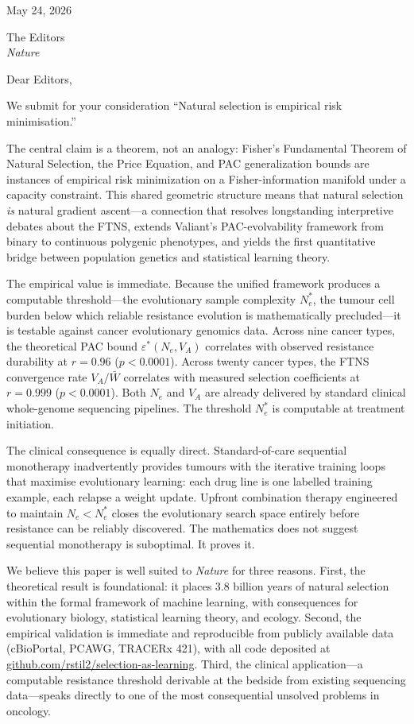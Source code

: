 \documentclass[11pt]{article}
\begin{document}
\noindent
May 24, 2026

\bigskip

\noindent
The Editors\\
\textit{Nature}

\bigskip

\noindent
Dear Editors,

\medskip

We submit for your consideration ``Natural selection is empirical risk minimisation.''

The central claim is a theorem, not an analogy: Fisher's Fundamental Theorem of
Natural Selection, the Price Equation, and PAC generalization bounds are
instances of empirical risk minimization on a Fisher-information manifold under a
capacity constraint. This shared geometric structure means that natural selection
\emph{is} natural gradient ascent---a connection that resolves longstanding
interpretive debates about the FTNS, extends Valiant's PAC-evolvability
framework from binary to continuous polygenic phenotypes, and yields the first
quantitative bridge between population genetics and statistical learning theory.

The empirical value is immediate. Because the unified framework produces a
computable threshold---the evolutionary sample complexity $N_e^*$, the tumour
cell burden below which reliable resistance evolution is mathematically
precluded---it is testable against cancer evolutionary genomics data. Across nine
cancer types, the theoretical PAC bound $\varepsilon^*(N_e, V_A)$ correlates with
observed resistance durability at $r = 0.96$ ($p < 0.0001$). Across twenty cancer
types, the FTNS convergence rate $V_A/\bar{W}$ correlates with measured selection
coefficients at $r = 0.999$ ($p < 0.0001$). Both $N_e$ and $V_A$ are already
delivered by standard clinical whole-genome sequencing pipelines. The threshold
$N_e^*$ is computable at treatment initiation.

The clinical consequence is equally direct. Standard-of-care sequential
monotherapy inadvertently provides tumours with the iterative training loops that
maximise evolutionary learning: each drug line is one labelled training example,
each relapse a weight update. Upfront combination therapy engineered to maintain
$N_e < N_e^*$ closes the evolutionary search space entirely before resistance can
be reliably discovered. The mathematics does not suggest sequential monotherapy
is suboptimal. It proves it.

We believe this paper is well suited to \textit{Nature} for three reasons. First,
the theoretical result is foundational: it places 3.8 billion years of natural
selection within the formal framework of machine learning, with consequences for
evolutionary biology, statistical learning theory, and ecology. Second, the
empirical validation is immediate and reproducible from publicly available data
(cBioPortal, PCAWG, TRACERx 421), with all code deposited at
\href{https://github.com/rstil2/selection-as-learning}{github.com/rstil2/selection-as-learning}.
Third, the clinical application---a computable resistance threshold derivable at
the bedside from existing sequencing data---speaks directly to one of the most
consequential unsolved problems in oncology.
\end{document}
